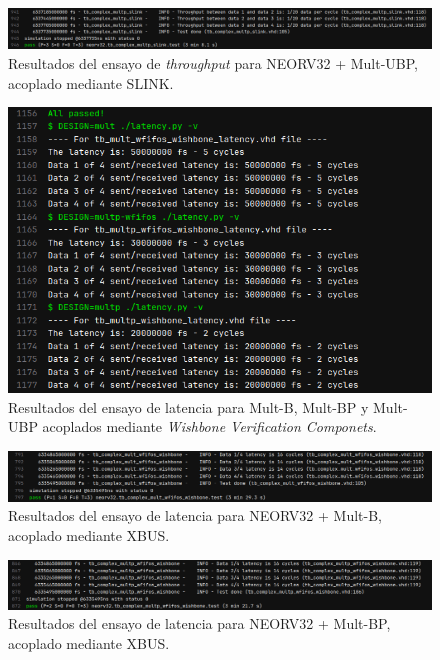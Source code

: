\begin{figure}[H]
    \centering
    \includegraphics[width=14cm]{Figuras/result/thr4.png}
    \caption{Resultados del ensayo de \textit{throughput} para NEORV32 + Mult-UBP, acoplado mediante SLINK.}
    \label{fig:thr4}
\end{figure}

\begin{figure}[H]
    \centering
    \includegraphics[width=14cm]{Figuras/result/lat5.png}
    \caption{Resultados del ensayo de latencia para Mult-B, Mult-BP y Mult-UBP acoplados mediante \textit{Wishbone Verification Componets}.}
    \label{fig:lat5}
\end{figure}

\begin{figure}[H]
    \centering
    \includegraphics[width=14cm]{Figuras/result/lat6.png}
    \caption{Resultados del ensayo de latencia para NEORV32 + Mult-B, acoplado mediante XBUS.}
    \label{fig:lat6}
\end{figure}

\begin{figure}[H]
    \centering
    \includegraphics[width=14cm]{Figuras/result/lat7.png}
    \caption{Resultados del ensayo de latencia para NEORV32 + Mult-BP, acoplado mediante XBUS.}
    \label{fig:lat7}
\end{figure}

